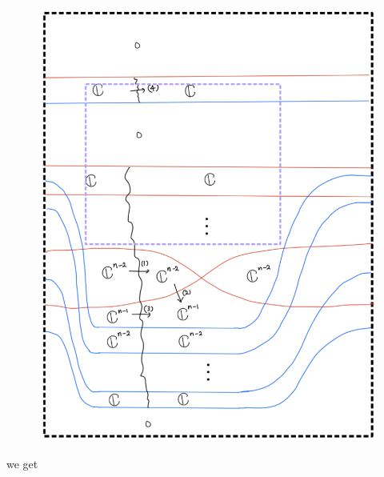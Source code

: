 \begin{enumerate}[label = (\roman*)]
\begin{enumerate}[label = (Case \arabic*)]
\begin{enumerate}[label = (Step \arabic*)]
\begin{figure}[H]
    \centering
    \includegraphics[scale = 0.95]{diagrams/cobord_gen/14.png}
    \caption{}
    \label{fig:your-label}
\end{figure}
\pagebreak
we get


\end{enumerate}
\end{enumerate}
\end{enumerate}
